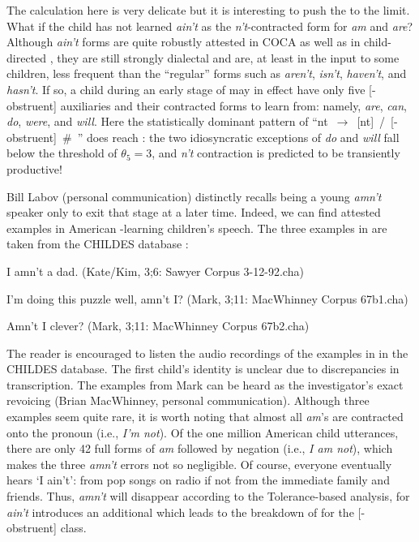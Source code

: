 \documentclass[output=paper,
modfonts
]{LSP/langsci}
\begin{document}
 The calculation here is very delicate but it is
interesting to push the  to the limit. 
What if the
child has not learned \textit{ain't} as the \textit{n't}-contracted form for
\textit{am} and \textit{are}? Although \textit{ain't} forms are quite robustly
attested in COCA as well as in child-directed , they are still
strongly dialectal and are, at least in the input to some children,  less frequent
than the ``regular'' forms such as \textit{
  aren't}, \textit{isn't}, \textit{haven't}, and \textit{hasn't}. If so, a
child during an early stage of  may 
in effect have only five [-obstruent] auxiliaries and their contracted
forms to learn from: namely, \textit{  are}, \textit{can}, \textit{
  do}, \textit{were}, and \textit{will}. Here the statistically dominant
pattern of
``nt~$\longrightarrow$~[nt]~/~[-obstruent]~\#~\underline{\hspace{0.5cm}}''
does reach : the two idiosyncratic exceptions of \textit{do} and
\textit{will} fall below the threshold of $\theta_{5} = 3$, and 
\textit{n't} contraction is predicted to be transiently productive! 

Bill Labov (personal communication) distinctly recalls being a young
\textit{amn't} speaker only to exit that stage at a later time.
Indeed, we can find attested examples in American -learning children's
speech.  
The three examples in  are taken from the CHILDES
database \citep{CHILDES}: 

\begin{exe} \ex \label{amnt}
\begin{xlist} 
\item I amn't a dad. (Kate/Kim, 3;6: Sawyer Corpus 3-12-92.cha) \label{katekim}
\item I'm doing this puzzle well, amn't I? (Mark, 3;11: MacWhinney
  Corpus 67b1.cha)
\item Amn't I clever? (Mark, 3;11: MacWhinney Corpus 67b2.cha)
\end{xlist} \end{exe}

The reader is encouraged to listen the
  audio recordings of the examples in   in the CHILDES
  database. The first child's 
identity is unclear due to discrepancies in transcription. The examples
from Mark can be heard as the investigator's  exact
revoicing (Brian MacWhinney, personal communication). Although three
examples seem quite rare, it is worth noting that almost all \textit{am}'s are contracted onto the pronoun (i.e., \emph{I'm not}). Of the one million American  child utterances, there are only 42
full forms of \textit{am} followed by negation (i.e., \emph{I am not}),
which makes the three \textit{amn't} errors not so negligible.
Of course, everyone eventually hears `I ain't': from pop songs on
radio if not from the immediate family and friends. Thus,
 \textit{amn't} will disappear according to the Tolerance-based
analysis, for \textit{ain't} introduces an additional  which leads to
the breakdown of  for the [-obstruent] class.
\end{document}
